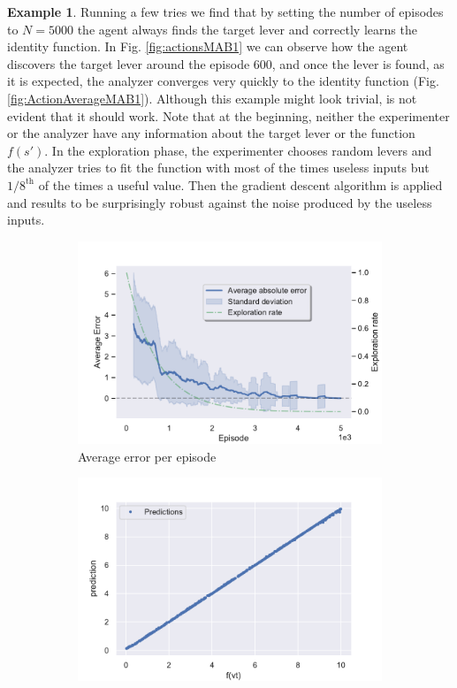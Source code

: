 \documentclass[11pt,a4paper,twoside]{report}
\newcommand{\+}{\textnormal{+} }
\theoremstyle{definition}
\newtheorem{myex}[mythm]{Example}
\numberwithin{equation}{chapter}
\begin{document}
\begin{myex}
    Running a few tries we find that by setting the number of episodes to
    $N=5000$ the agent always finds the target lever and correctly learns the
    identity function. In Fig. \ref{fig:actionsMAB1} we can observe how the
    agent discovers the target lever around the episode 600, and once the lever
    is found, as it is expected, the analyzer converges very quickly to the
    identity function (Fig. \ref{fig:ActionAverageMAB1}). Although this example
    might look trivial, is not evident that it should work. Note that at the
    beginning, neither the experimenter or the analyzer have any information
    about the target lever or the function $f(s')$. In the exploration phase,
    the experimenter chooses random levers and the analyzer tries to fit the
    function with most of the times useless inputs but $1/8^{\text{th}}$ of the
    times a useful value. Then the gradient descent algorithm is applied and
    results to be surprisingly robust against the noise produced by the useless
    inputs.
    \begin{figure}[]
      \centering
      \begin{subfigure}{.5\textwidth}
        \centering
        \includegraphics[width=1\linewidth]{figures/Error-MAB1.pdf}
        \caption{Average error per episode}
        \label{fig:ErrorAverageMAB1}
      \end{subfigure}%
      \begin{subfigure}{.5\textwidth}
        \centering
        \includegraphics[width=1\linewidth]{figures/predictions-MAB1.pdf}

\end{subfigure}
\end{figure}
\end{myex}
\end{document}
